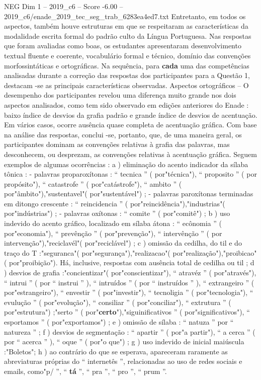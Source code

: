 \begin{textsample}{NEG Dim 1 – 2019\_c6 – Score -6.00 – 2019\_c6/enade\_2019\_tec\_seg\_trab\_6283ea4ed7.txt}
Entretanto, em todos os aspectos, também houve estruturas em que se respeitaram as características da modalidade escrita formal do padrão culto da Língua Portuguesa.
Nas respostas que foram avaliadas como boas, os estudantes apresentaram desenvolvimento textual fluente e coerente, vocabulário formal e técnico, domínio das convenções morfossintáticas e ortográficas.
Na sequência, para \textbf{cada} uma das competências analisadas durante a correção das respostas dos participantes para a Questão 1, destacam -se as principais características observadas.
Aspectos ortográficos – O desempenho dos participantes revelou uma diferença muito grande nos dois aspectos analisados, como tem sido observado em edições anteriores do Enade : baixo índice de desvios da grafia padrão e grande índice de desvios de acentuação.
Em vários casos, ocorre ausência quase completa de acentuação gráfica.
Com base na análise das respostas, conclui -se, portanto, que, de uma maneira geral, os participantes dominam as convenções relativas à grafia das palavras, mas desconhecem, ou desprezam, as convenções relativas à acentuação gráfica.
Seguem exemplos de algumas ocorrências : a ) eliminação do acento indicador da sílaba tônica : - palavras proparoxítonas : “ tecnica ” ( por"técnica"), “ proposito ” ( por propósito"), “ catastrofe ” ( por"catástrofe"), “ ambito ” ( por"âmbito"),"sustentavel"( por"sustentável") ; - palavras paroxítonas terminadas em ditongo crescente : “ reincidencia ” ( por"reincidência"),"industrias"( por"indústrias") ; - palavras oxítonas : “ comite ” ( por"comitê") ; b ) uso indevido do acento gráfico, localizado em sílaba átona : “ ecônomia ” ( por"economia"), “ prevênção ” ( por"prevenção"), “ intervênção ” ( por intervenção"),"reciclavél"( por"reciclável") ; c ) omissão da cedilha, do til e do traço do T :"seguranca"( por"segurança"),"realizacao"( por"realização"),"proibicao"( por"proibição").
Há, inclusive, respostas com ausência total de cedilha ou til ; d ) desvios de grafia :"concientizar"( por"conscientizar"), “ atravéz ” ( por"através"), “ intrui ” ( por “ instrui ” ), “ intruídos ” ( por “ instruídos ” ), “ extrangeiro ” ( por"estrangeiro"), “ envestir ” ( por"investir"), “ tecnoligia ” ( por"tecnologia"), “ evulução ” ( por"evolução"), “ consiliar ” ( por"conciliar"), “ extrutura ” ( por"estrutura") ;"serto ” ( por"\textbf{certo}"),"siguinificativos ” ( por"significativos"), “ esportamos ” ( por"exportamos") ; e ) omissão de sílaba : “ natuza ” por “ natureza ” ; f ) desvios de segmentação : “ apartir ” ( por"a partir"), “ a cerca ” ( por “ acerca ” ), “ oque ” ( por"o que") ; g ) uso indevido de inicial maiúscula :"Boletos"; h ) ao contrário do que se esperava, apareceram raramente as abreviaturas próprias do “ internetês ”, relacionadas ao uso de redes sociais e emails, como"p/ ”, “ \textbf{tá} ”, “ pra ”, “ pro ”, “ prum ”.

\end{textsample}
